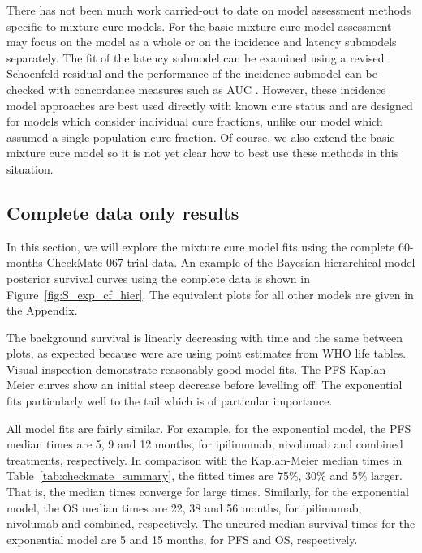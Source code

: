 \documentclass[AMA,STIX1COL]{WileyNJD-v2}
\begin{document}

There has not been much work carried-out to date on model assessment methods specific to mixture cure models.
For the basic mixture cure model assessment may focus on the model as a whole or on the incidence and latency submodels separately.
The fit of the latency submodel can be examined using a revised Schoenfeld residual \cite{Wileyto2013} and the performance of the incidence submodel can be checked with concordance measures such as AUC \cite{Peng2021}.
However, these incidence model approaches are best used directly with known cure status and are designed for models which consider individual cure fractions, unlike our model which assumed a single population cure fraction.
Of course, we also extend the basic mixture cure model so it is not yet clear how to best use these methods in this situation. 

%
\subsection{Complete data only results} \label{sec:results}
In this section, we will explore the mixture cure model fits using the complete 60-months CheckMate 067 trial data.
An example of the Bayesian hierarchical model posterior survival curves using the complete data is shown in Figure~\ref{fig:S_exp_cf_hier}.
The equivalent plots for all other models are given in the Appendix.

The background survival is linearly decreasing with time and the same between plots, as expected because were are using point estimates from WHO life tables.
Visual inspection demonstrate reasonably good model fits.
The PFS Kaplan-Meier curves show an initial steep decrease before levelling off.
The exponential fits particularly well to the tail which is of particular importance.

All model fits are fairly similar. For example, for the exponential model, the PFS median times are 5, 9 and 12 months, for ipilimumab, nivolumab and combined treatments, respectively.
In comparison with the Kaplan-Meier median times in Table~\ref{tab:checkmate_summary}, the fitted times are 75\%, 30\% and 5\% larger. That is, the median times converge for large times.
Similarly, for the exponential model, the OS median times are 22, 38 and 56 months, for ipilimumab, nivolumab and combined, respectively.
The uncured median survival times for the exponential model are 5 and 15 months, for PFS and OS, respectively.
\end{document}
